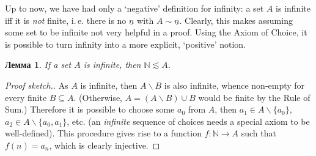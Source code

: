 \documentclass[12pt,notitlepage]{article}
\theoremstyle{plain}
\newtheorem{lemma}[thm]{Лемма}
\theoremstyle{definition}
\newtheorem{exm}[thm]{Пример}
\newtheorem{rem}[thm]{Замечание}
\theoremstyle{plain}
\newcommand{\N}{\mathbb{N}}
\newcommand{\sbs}{\subseteq}
\renewcommand{\setminus}{\smallsetminus}
\newcommand{\void}{\varnothing}
\newcommand{\mP}{\mathcal{P}}
\newcommand{\ul}[1]{\underline{#1}}
\newcommand{\1}{\mathbf{1}}
\newcommand{\0}{\mathbf{0}}
\begin{document}
%
%
%

\medskip

Up to now, we have had only a `negative' definition for infinity: a set $A$ is infinite iff it is \emph{not} finite, i.\,e. there is no $\ul{n}$ with $A \sim \ul{n}$. Clearly, this makes assuming some set to be infinite not very helpful in a proof. Using the Axiom of Choice, it is possible to turn infinity into a more explicit, `positive' notion.

\begin{lemma}\label{L10:min_inf}
	If a set $A$ is infinite, then $\N \lesssim A$.
\end{lemma}
\begin{proof}[Proof sketch.]
	As $A$ is infinite, then $A \setminus B$ is also infinite, whence non-empty for every finite $B \sbs A$. (Otherwise, $A = (A \setminus B) \cup B$ would be finite by the Rule of Sum.) Therefore it is possible to choose some $a_0$ from $A$, then $a_1 \in A \setminus \{ a_0 \}$, $a_2 \in A \setminus \{ a_0, a_1 \}$, etc. (an \emph{infinite} sequence of choices needs a special axiom to be well-defined). This procedure gives rise to a function $f\colon \N\to A$ such that $f(n) = a_n$, which is clearly injective.
	
\end{proof}
\end{document}

